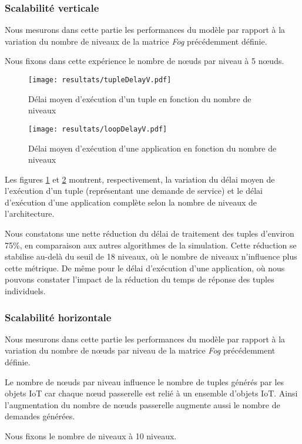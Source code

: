 \subsubsection{Scalabilité verticale}
Nous mesurons dans cette partie les performances du modèle par rapport à la variation du nombre de niveaux de la matrice \emph{Fog} précédemment définie.\par
Nous fixons dans cette expérience le nombre de nœuds par niveau à 5 nœuds.

\begin{figure}[H]
  \centering
  \texttt{[image: resultats/tupleDelayV.pdf]}
  \caption{Délai moyen d'exécution d'un tuple en fonction du nombre de niveaux}
  \label{fig:delai_tuple_vertical}
\end{figure}

\begin{figure}[H]
  \centering
  \texttt{[image: resultats/loopDelayV.pdf]}
  \caption{Délai moyen d'exécution d'une application en fonction du nombre de niveaux}
  \label{fig:delai_application_vertical}
\end{figure}

Les figures \ref{fig:delai_tuple_vertical} et \ref{fig:delai_application_vertical} montrent, respectivement, la variation du délai moyen de l'exécution d'un tuple (représentant une demande de service) et le délai d'exécution d'une application complète selon la nombre de niveaux de l'architecture.\par
Nous constatons une nette réduction du délai de traitement des tuples d'environ 75\%, en comparaison aux autres algorithmes de la simulation. Cette réduction se stabilise au-delà du seuil de 18 niveaux, où le nombre de niveaux n'influence plus cette métrique. De même pour le délai d'exécution d'une application, où nous pouvons constater l'impact de la réduction du temps de réponse des tuples individuels.

\subsubsection{Scalabilité horizontale}
Nous mesurons dans cette partie les performances du modèle par rapport à la variation du nombre de nœuds par niveau de la matrice \emph{Fog} précédemment définie.\par
Le nombre de nœuds par niveau influence le nombre de tuples générés par les objets IoT car chaque nœud passerelle est relié à un ensemble d’objets IoT. Ainsi l’augmentation du nombre de nœuds passerelle augmente aussi le nombre de demandes générées.\par
Nous fixons le nombre de niveaux à 10 niveaux.

